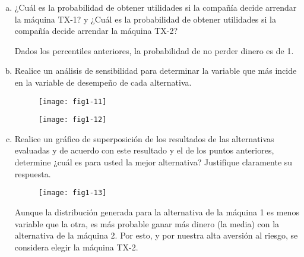 \documentclass[../main.tex]{subfiles}
\begin{document}
\begin{enumerate}[(a)]
\item ¿Cuál es la probabilidad de obtener utilidades si la compañía decide
arrendar la máquina TX-1? y ¿Cuál es la probabilidad de obtener utilidades si la
compañía decide arrendar la máquina TX-2?

Dados los percentiles anteriores, la probabilidad de no perder dinero es de 1.

\item Realice un análisis de sensibilidad para determinar la variable que más
incide en la variable de desempeño de cada alternativa.

\begin{figure}[h]
\centering
\texttt{[image: fig1-11]}
\label{fig:img1}
\end{figure}

\begin{figure}[h]
\centering
\texttt{[image: fig1-12]}
\label{fig:img1}
\end{figure}

\pagebreak

\item Realice un gráfico de superposición de los resultados de las alternativas
evaluadas y de acuerdo con este resultado y el de los puntos anteriores, determine
¿cuál es para usted la mejor alternativa? Justifique claramente su respuesta.

\begin{figure}[h]
\centering
\texttt{[image: fig1-13]}
\label{fig:img1}
\end{figure}

Aunque la distribución generada para la alternativa de la máquina 1 es menos variable que la otra, es más probable ganar más dinero (la media) con la alternativa de la máquina 2. Por esto, y por nuestra alta aversión al riesgo, se considera elegir la máquina TX-2.

\end{enumerate}
\end{document}
